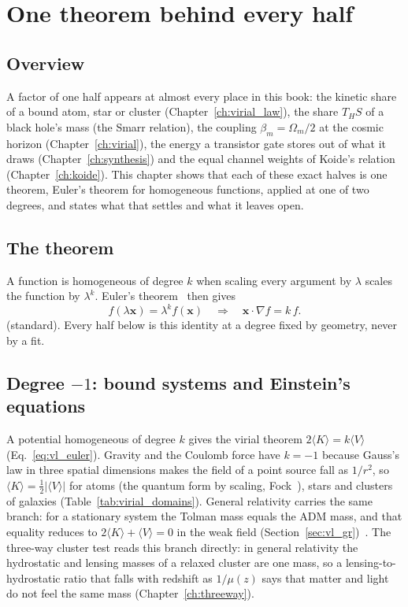\chapter{One theorem behind every half}\label{ch:euler_halves}

\section*{Overview}
A factor of one half appears at almost every place in this book: the kinetic share of a bound atom, star or cluster
(Chapter~\ref{ch:virial_law}), the share $T_HS$ of a black hole's mass (the Smarr relation), the coupling $\beta_m=\Omega_m/2$ at the cosmic horizon
(Chapter~\ref{ch:virial}), the energy a transistor gate stores out of what it draws (Chapter~\ref{ch:synthesis}) and the equal channel weights of
Koide's relation (Chapter~\ref{ch:koide}). This chapter shows that each of these exact halves is one theorem, Euler's theorem for homogeneous
functions, applied at one of two degrees, and states what that settles and what it leaves open. \derived

\section{The theorem}\label{sec:eh_theorem}
A function is homogeneous of degree $k$ when scaling every argument by $\lambda$ scales the function by $\lambda^k$. Euler's
theorem~\cite{Goldstein} then gives
\begin{equation}
f(\lambda\mathbf x)=\lambda^kf(\mathbf x)\quad\Longrightarrow\quad \mathbf x\cdot\nabla f=k\,f .\label{eq:eh_euler}
\end{equation}
\derived{} (standard). Every half below is this identity at a degree fixed by geometry, never by a fit.

\section{Degree $-1$: bound systems and Einstein's equations}\label{sec:eh_branch1}
A potential homogeneous of degree $k$ gives the virial theorem $2\langle K\rangle=k\langle V\rangle$ (Eq.~\eqref{eq:vl_euler}). Gravity and the
Coulomb force have $k=-1$ because Gauss's law in three spatial dimensions makes the field of a point source fall as $1/r^2$, so
$\langle K\rangle=\tfrac12|\langle V\rangle|$ for atoms (the quantum form by scaling, Fock~\cite{Fock1930}), stars and clusters of galaxies
(Table~\ref{tab:virial_domains}). \derived{} General relativity carries the same branch: for a stationary system the Tolman mass equals the ADM mass,
and that equality reduces to $2\langle K\rangle+\langle V\rangle=0$ in the weak field (Section~\ref{sec:vl_gr})~\cite{Tolman1930,GourgoulhonBonazzola1994}.
\derived{} The three-way cluster test reads this branch directly: in general relativity the hydrostatic and lensing masses of a relaxed cluster are
one mass, so a lensing-to-hydrostatic ratio that falls with redshift as $1/\mu(z)$ says that matter and light do not feel the same mass
(Chapter~\ref{ch:threeway}). \interp

